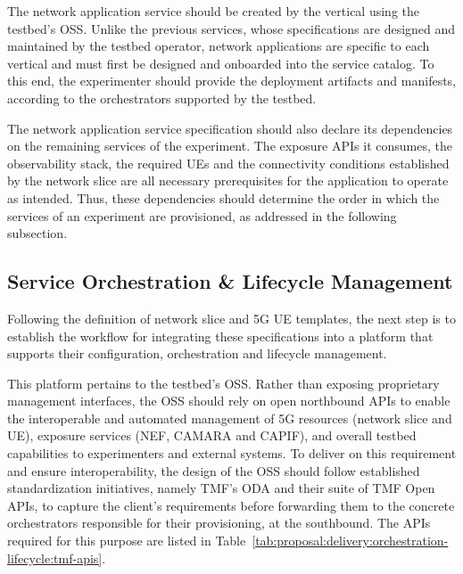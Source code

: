
The network application service should be created by the vertical using the testbed's \acs{OSS}. Unlike the previous services, whose specifications are designed and maintained by the testbed operator, network applications are specific to each vertical and must first be designed and onboarded into the service catalog. To this end, the experimenter should provide the deployment artifacts and manifests, according to the orchestrators supported by the testbed.

The network application service specification should also declare its dependencies on the remaining services of the experiment. The exposure \acsp{API} it consumes, the observability stack, the required \acsp{UE} and the connectivity conditions established by the network slice are all necessary prerequisites for the application to operate as intended. Thus, these dependencies should determine the order in which the services of an experiment are provisioned, as addressed in the following subsection.


\subsection{Service Orchestration \& Lifecycle Management}
\label{chap:proposal:delivery:orchestration-lifecycle}

Following the definition of network slice and \acs{5G} \acs{UE} templates, the next step is to establish the workflow for integrating these specifications into a platform that supports their configuration, orchestration and lifecycle management.

This platform pertains to the testbed's \acs{OSS}. Rather than exposing proprietary management interfaces, the \acs{OSS} should rely on open northbound \acsp{API} to enable the interoperable and automated management of \acs{5G} resources (network slice and \acs{UE}), exposure services (\acs{NEF}, CAMARA and \acs{CAPIF}), and overall testbed capabilities to experimenters and external systems. To deliver on this requirement and ensure interoperability, the design of the \acs{OSS} should follow established standardization initiatives, namely \acs{TMF}'s \acs{ODA} and their suite of \acs{TMF} Open \acsp{API}, to capture the client's requirements before forwarding them to the concrete orchestrators responsible for their provisioning, at the southbound. The \acsp{API} required for this purpose are listed in Table~\ref{tab:proposal:delivery:orchestration-lifecycle:tmf-apis}.

